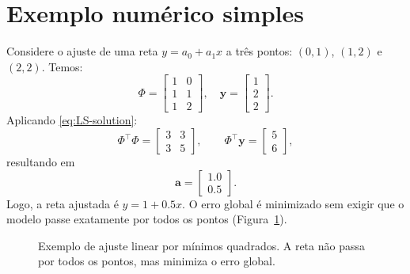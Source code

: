 \section{Exemplo numérico simples}
Considere o ajuste de uma reta $y = a_0 + a_1x$ a três pontos: $(0,1)$, $(1,2)$ e $(2,2)$.  
Temos:
\[
\Phi = 
\begin{bmatrix}
1 & 0 \\
1 & 1 \\
1 & 2
\end{bmatrix}, \quad
\mathbf{y} =
\begin{bmatrix}
1 \\ 2 \\ 2
\end{bmatrix}.
\]
Aplicando \eqref{eq:LS-solution}:
\[
\Phi^\top\Phi =
\begin{bmatrix}
3 & 3 \\ 3 & 5
\end{bmatrix},
\qquad
\Phi^\top\mathbf{y} =
\begin{bmatrix}
5 \\ 6
\end{bmatrix},
\]
resultando em
\[
\mathbf{a} =
\begin{bmatrix}
1.0 \\ 0.5
\end{bmatrix}.
\]
Logo, a reta ajustada é $y = 1 + 0.5x$.  
O erro global é minimizado sem exigir que o modelo passe exatamente por todos os pontos (Figura~\ref{fig:ls-fit}).

\begin{figure}[h!]
\centering
{}
\caption{Exemplo de ajuste linear por mínimos quadrados. A reta não passa por todos os pontos, mas minimiza o erro global.}
\label{fig:ls-fit}
\end{figure}

